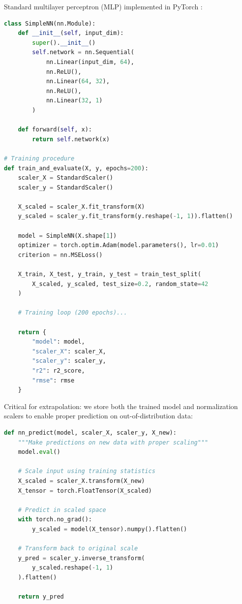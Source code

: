 \documentclass[twoside,11pt]{article}
\begin{document}
Standard multilayer perceptron (MLP) implemented in PyTorch \citep{paszke2019pytorch}:

\begin{lstlisting}[language=Python, caption=Neural Network Architecture]
class SimpleNN(nn.Module):
    def __init__(self, input_dim):
        super().__init__()
        self.network = nn.Sequential(
            nn.Linear(input_dim, 64),
            nn.ReLU(),
            nn.Linear(64, 32),
            nn.ReLU(),
            nn.Linear(32, 1)
        )

    def forward(self, x):
        return self.network(x)

# Training procedure
def train_and_evaluate(X, y, epochs=200):
    scaler_X = StandardScaler()
    scaler_y = StandardScaler()

    X_scaled = scaler_X.fit_transform(X)
    y_scaled = scaler_y.fit_transform(y.reshape(-1, 1)).flatten()

    model = SimpleNN(X.shape[1])
    optimizer = torch.optim.Adam(model.parameters(), lr=0.01)
    criterion = nn.MSELoss()

    X_train, X_test, y_train, y_test = train_test_split(
        X_scaled, y_scaled, test_size=0.2, random_state=42
    )

    # Training loop (200 epochs)...

    return {
        "model": model,
        "scaler_X": scaler_X,
        "scaler_y": scaler_y,
        "r2": r2_score,
        "rmse": rmse
    }
\end{lstlisting}

Critical for extrapolation: we store both the trained model and normalization scalers to enable proper prediction on out-of-distribution data:

\begin{lstlisting}[language=Python, caption=Neural Network Prediction with Proper Scaling]
def nn_predict(model, scaler_X, scaler_y, X_new):
    """Make predictions on new data with proper scaling"""
    model.eval()

    # Scale input using training statistics
    X_scaled = scaler_X.transform(X_new)
    X_tensor = torch.FloatTensor(X_scaled)

    # Predict in scaled space
    with torch.no_grad():
        y_scaled = model(X_tensor).numpy().flatten()

    # Transform back to original scale
    y_pred = scaler_y.inverse_transform(
        y_scaled.reshape(-1, 1)
    ).flatten()

    return y_pred
\end{lstlisting}
\end{document}
